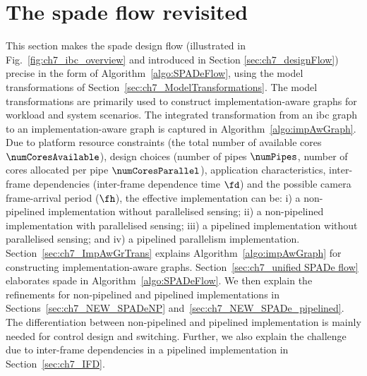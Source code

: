 \section{\texorpdfstring{The \Gls{spade}}{SPADe} flow revisited}
\label{sec:ch7_SPADeRevisited}
This section makes the \gls{spade} design flow (illustrated in Fig.~\ref{fig:ch7_ibc_overview} and introduced in Section \ref{sec:ch7_designFlow}) precise in the form of Algorithm~\ref{algo:SPADeFlow}, using the model transformations of Section~\ref{sec:ch7_ModelTransformations}. The model transformations are primarily used to construct implementation-aware graphs for workload and system scenarios. The integrated transformation from an \gls{ibc} graph to an implementation-aware graph is captured in Algorithm~\ref{algo:impAwGraph}.
Due to platform resource constraints (the total number of available cores $\numCoresAvailable$), design choices (number of pipes $\numPipes$, number of cores allocated per pipe $\numCoresParallel$), application characteristics, inter-frame dependencies (inter-frame dependence time $\fd$) and the possible camera frame-arrival period ($\fh$), the effective implementation can be: i) a non-pipelined implementation without parallelised sensing; ii) a non-pipelined implementation with parallelised sensing; iii) a pipelined implementation without parallelised sensing; and iv) a pipelined parallelism implementation. Section~\ref{sec:ch7_ImpAwGrTrans} explains Algorithm~\ref{algo:impAwGraph} for constructing implementation-aware graphs.
Section~\ref{sec:ch7_unified SPADe flow} elaborates \gls{spade} in Algorithm~\ref{algo:SPADeFlow}. We then explain the refinements for non-pipelined and pipelined implementations in Sections~\ref{sec:ch7_NEW_SPADeNP} and~\ref{sec:ch7_NEW_SPADe_pipelined}. 
The differentiation between non-pipelined and pipelined implementation is mainly needed for control design and switching. 
Further, we also explain the challenge due to inter-frame dependencies in a pipelined implementation in Section~\ref{sec:ch7_IFD}.

